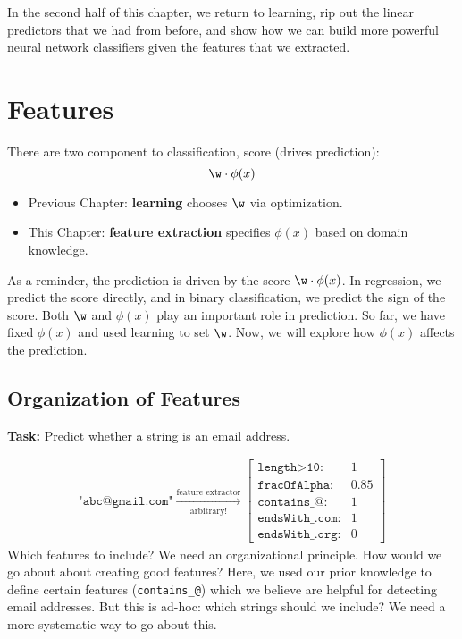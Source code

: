 In the second half of this chapter, we return to learning, %
rip out the linear predictors that we had from before,
and show how we can build more powerful neural network classifiers given the features that we extracted.

\section{Features} %
\label{sec:features}

There are two component to classification, score (drives prediction):
\[
	\w \cdot \phi(x)
\]
\begin{itemize} %
	\item Previous Chapter: \textbf{learning} chooses $\w$ via optimization.
	\item This Chapter: \textbf{feature extraction} specifies $\phi(x)$ based on domain knowledge.
\end{itemize}

As a reminder, the prediction is driven by the score $\w \cdot \phi(x)$.
In regression, we predict the score directly, and in binary classification, we predict the sign of the score.
Both $\w$ and $\phi(x)$ play an important role in prediction.
So far, we have fixed $\phi(x)$ and used learning to set $\w$.
Now, we will explore how $\phi(x)$ affects the prediction.


\pagebreak

\subsection{Organization of Features} %
\label{sub:organization_of_features}

\textbf{Task:} Predict whether a string is an email address.

\begin{align*}
	\texttt{"abc@gmail.com"} \xrightarrow[\text{arbitrary!}]{\text{feature extractor}} \begin{bmatrix}
	\texttt{length>10}: & 1\\
	\texttt{fracOfAlpha}: & 0.85\\
	\texttt{contains\_@}: & 1\\
	\texttt{endsWith\_.com}: & 1\\
	\texttt{endsWith\_.org}: & 0
	\end{bmatrix}
\end{align*}
Which features to include? We need an organizational principle.
% 
How would we go about about creating good features?
Here, we used our prior knowledge to define certain features (\texttt{contains\_@})
which we believe are helpful for detecting email addresses.
But this is ad-hoc: which strings should we include?
We need a more systematic way to go about this.


